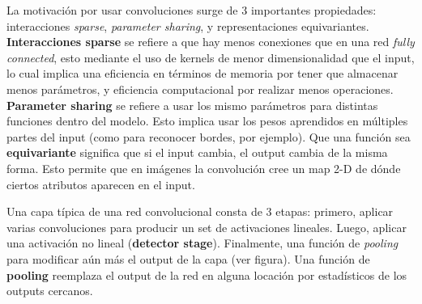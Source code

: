 La motivaci\'on por usar convoluciones surge de 3 importantes propiedades: interacciones \textit{sparse}, \textit{parameter sharing}, y representaciones equivariantes. \textbf{Interacciones sparse} se refiere a que hay menos conexiones que en una red \textit{fully connected}, esto mediante el uso de kernels de menor dimensionalidad que el input, lo cual implica una eficiencia en t\'erminos de memoria por tener que almacenar menos par\'ametros, y eficiencia computacional por realizar menos operaciones. \textbf{Parameter sharing} se refiere a usar los mismo par\'ametros para distintas funciones dentro del modelo. Esto implica usar los pesos aprendidos en m\'ultiples partes del input (como para reconocer bordes, por ejemplo). Que una funci\'on sea \textbf{equivariante} significa que si el input cambia, el output cambia de la misma forma. Esto permite que en im\'agenes la convoluci\'on cree un map 2-D de d\'onde ciertos atributos aparecen en el input.

Una capa t\'ipica de una red convolucional consta de 3 etapas: primero, aplicar varias convoluciones para producir un set de activaciones lineales. Luego, aplicar una activaci\'on no lineal (\textbf{detector stage}). Finalmente, una funci\'on de \textit{pooling} para modificar a\'un m\'as el output de la capa (ver figura). Una funci\'on de \textbf{pooling} reemplaza el output de la red en alguna locaci\'on por estad\'isticos de los outputs cercanos. 

